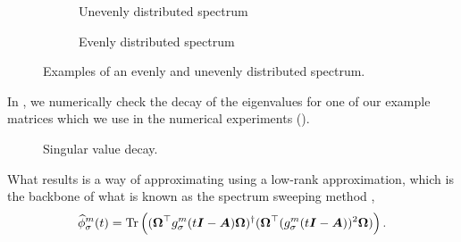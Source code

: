 \begin{figure}
    \centering
    \begin{subfigure}[t]{0.45\columnwidth}
        
        \caption{Unevenly distributed spectrum}
    \end{subfigure}
    \begin{subfigure}[t]{0.45\columnwidth}
        
        \caption{Evenly distributed spectrum}
    \end{subfigure}      
    \caption{Examples of an evenly and unevenly distributed spectrum.}
    \label{fig:3-nystrom-evenly-distributed-spectrum}
\end{figure}

In , we numerically check the decay
of the eigenvalues for one of our example matrices which we use in the numerical
experiments ().
\begin{figure}[ht]
    \centering
    
    \caption{Singular value decay. }
    \label{fig:3-nystrom-singular-value-decay}
\end{figure}


What results is a way of approximating 
using a low-rank approximation, which is the backbone of what is known
as the spectrum sweeping method \cite{lin2017randomized},
\begin{equation}
    \widehat{\phi}_{\sigma}^m(t)
        = \operatorname{Tr}\left((\boldsymbol{\Omega}^{\top} g_{\sigma}^m(t\boldsymbol{I} - \boldsymbol{A}) \boldsymbol{\Omega})^{\dagger} (\boldsymbol{\Omega}^{\top} (g_{\sigma}^m(t\boldsymbol{I} - \boldsymbol{A}))^2 \boldsymbol{\Omega})\right).
    \label{equ:3-nystrom-spectral-density}
\end{equation}\\

